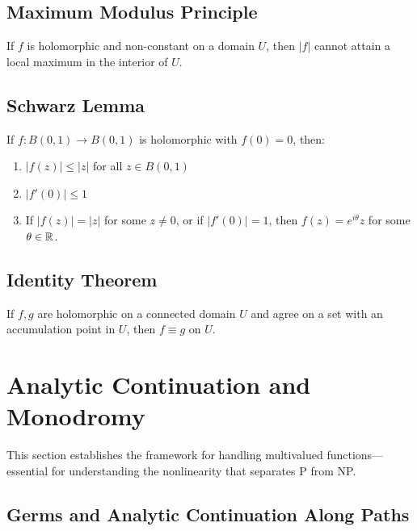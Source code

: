 \subsection{Maximum Modulus Principle}

\begin{theorem}\label{thm:maximum-modulus}
If $f$ is holomorphic and non-constant on a domain $U$, then $|f|$ cannot attain a local maximum in the interior of $U$.
\end{theorem}

\subsection{Schwarz Lemma}

\begin{lemma}[Schwarz]\label{lem:schwarz}
If $f: B(0,1) \to B(0,1)$ is holomorphic with $f(0) = 0$, then:
\begin{enumerate}
\item $|f(z)| \leq |z|$ for all $z \in B(0,1)$
\item $|f'(0)| \leq 1$
\item If $|f(z)| = |z|$ for some $z \neq 0$, or if $|f'(0)| = 1$, then $f(z) = e^{i\theta} z$ for some $\theta \in \mathbb{R}$.
\end{enumerate}
\end{lemma}

\subsection{Identity Theorem}

\begin{theorem}\label{thm:identity}
If $f, g$ are holomorphic on a connected domain $U$ and agree on a set with an accumulation point in $U$, then $f \equiv g$ on $U$.
\end{theorem}

\section{Analytic Continuation and Monodromy}
\label{sec:analytic-continuation}

This section establishes the framework for handling multivalued functions—essential for understanding the nonlinearity that separates P from NP.

\subsection{Germs and Analytic Continuation Along Paths}

